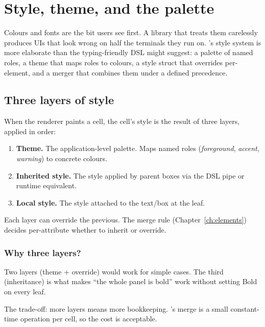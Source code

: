 \chapter{Style, theme, and the palette}
\label{ch:style}

\begin{aside}
Colours and fonts are the bit users see first. A library that
treats them carelessly produces UIs that look wrong on half the
terminals they run on. \maya{}'s style system is more elaborate
than the typing-friendly DSL might suggest: a palette of named
roles, a theme that maps roles to colours, a style struct that
overrides per-element, and a merger that combines them under a
defined precedence.
\end{aside}

\section{Three layers of style}

When the renderer paints a cell, the cell's style is the result
of three layers, applied in order:

\begin{enumerate}[leftmargin=*]
  \item \textbf{Theme.} The application-level palette. Maps named
    roles (\emph{foreground}, \emph{accent}, \emph{warning})
    to concrete colours.
  \item \textbf{Inherited style.} The style applied by parent
    boxes via the DSL pipe or runtime equivalent.
  \item \textbf{Local style.} The style attached to the
    text/box at the leaf.
\end{enumerate}

Each layer can override the previous. The merge rule
(Chapter~\ref{ch:elements}) decides per-attribute whether to
inherit or override.

\subsection*{Why three layers?}

Two layers (theme + override) would work for simple cases. The
third (inheritance) is what makes ``the whole panel is bold''
work without setting Bold on every leaf.

The trade-off: more layers means more bookkeeping. \maya{}'s
merge is a small constant-time operation per cell, so the cost
is acceptable.

